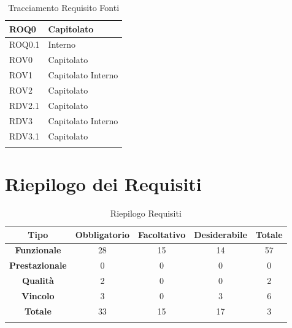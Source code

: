 \documentclass[../AnalisideiRequisiti.tex]{subfiles}
\begin{document}
\begin{longtable}{| p{4cm} | p{4cm} |}
\newline ROQ0&\newline Capitolato
\\[1em]
\hline
\newline ROQ0.1&\newline Interno
\\[1em]
\hline
\newline ROV0&\newline Capitolato
\\[1em]
\hline	
\newline 
ROV1&\newline Capitolato \newline Interno
\\[1em]
\hline
\newline 
ROV2&\newline Capitolato
\\[1em]
\hline
\newline
RDV2.1&\newline Capitolato
\\[1em]
\hline
\newline
RDV3&\newline Capitolato \newline Interno
\\[1em]
\hline	
\newline
RDV3.1&\newline Capitolato
\\[1em]
\hline
\caption{Tracciamento Requisito Fonti}
\end{longtable}
\section{Riepilogo dei Requisiti}
	\begin{longtable}{| c | c | c | c | c |}
	\hline
	\textbf{Tipo} & \textbf{Obbligatorio}& \textbf{Facoltativo} &\textbf{Desiderabile} &\textbf{Totale} \\
	\hline
	\endhead
\textbf{Funzionale} &28& 15 & 14 & 57\\

\hline\textbf{Prestazionale} &0& 0& 0 &0  \\

\hline\textbf{Qualità} &2& 0&0&2 \\

\hline\textbf{Vincolo}&3&0& 3 & 6 \\

\hline\textbf{Totale}&33& 15& 17 & 3 \\

\hline
\caption{Riepilogo Requisiti}
\end{longtable}
\end{document}
